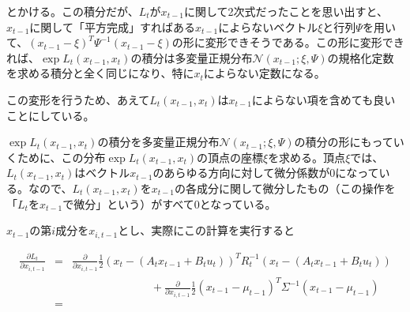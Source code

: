 \documentclass{jarticle}
\begin{document}
とかける。この積分だが、$L_t$が$x_{t-1}$に関して2次式だったことを思い出すと、$x_{t-1}$に関して「平方完成」すればある$x_{t-1}$によらないベクトル$\xi$と行列$\Psi$を用いて、$(x_{t-1}-\xi)^T \Psi^{-1} (x_{t-1}-\xi)$の形に変形できそうである。この形に変形できれば、$\exp L_t (x_{t-1},x_t)$の積分は多変量正規分布$\mathcal{N}(x_{t-1};\xi,\Psi )$の規格化定数を求める積分と全く同じになり、特に$x_t$によらない定数になる。

この変形を行うため、あえて$L_t (x_{t-1},x_t)$は$x_{t-1}$によらない項を含めても良いことにしている。

$\exp L_t (x_{t-1},x_t)$の積分を多変量正規分布$\mathcal{N}(x_{t-1};\xi,\Psi )$の積分の形にもっていくために、この分布$\exp L_t (x_{t-1},x_t)$の頂点の座標$\xi$を求める。頂点$\xi$では、$L_t (x_{t-1},x_t)$はベクトル$x_{t-1}$のあらゆる方向に対して微分係数が0になっている。なので、$L_t (x_{t-1},x_t)$を$x_{t-1}$の各成分に関して微分したもの（この操作を「$L_t$を$x_{t-1}$で微分」という）がすべて0となっている。

$x_{t-1}$の第$i$成分を$x_{i,t-1}$とし、実際にこの計算を実行すると

\begin{eqnarray}
\frac{\partial  L_t}{\partial x_{i,t-1}}  &=&\frac{\partial }{\partial x_{i,t-1}}   \frac{1}{2}(x_t - (A_t x_{t-1} + B_t u_t))^T R_t ^{-1}(x_t - (A_t x_{t-1} + B_t u_t)) \nonumber  \\
 && \hspace{3cm}+\frac{\partial }{\partial x_{i,t-1}}  \frac{1}{2} (x_{t-1}-\mu _{t-1})^T  \Sigma ^{-1}  (x_{t-1}-\mu _{t-1}) \\
 &=&
\end{eqnarray}
\end{document}

